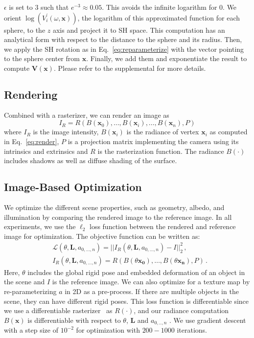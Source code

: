 %
%
$\epsilon$ is set to $3$ such that $e^{-3} \approx 0.05$. 
%
This avoids the infinite logarithm for 0. 
%
We orient $\log (V^{'}_{i}(\omega,\mathbf{x}))$, the logarithm of this approximated function for each sphere, to the $z$ axis and project it to SH space. 
%
This computation has an analytical form with respect to the distance to the sphere and its radius.
%
Then, we apply the SH rotation as in Eq.~\ref{eq:reparameterize} with the vector pointing to the sphere center from $\mathbf{x}$. 
%
Finally, we add them and exponentiate the result to compute $\boldsymbol{V}(\mathbf{x})$.
%
Please refer to the supplemental for more details. 
%
%
\subsection{Rendering}
%
\label{diffuse_shading}
%
Combined with a rasterizer, we can render an image as
%
%
\begin{equation}
I_R=R( B(\mathbf{x}_{0}),\dots,B(\mathbf{x}_{i}),\dots,B(\mathbf{x}_{n}), P)
\end{equation}
%
%
where $I_R$ is the image intensity, $B(\mathbf{x}_{i})$ is the radiance of vertex $\mathbf{x}_{i}$ as computed in Eq.~\ref{eq:render}, $P$ is a projection matrix implementing the camera using its intrinsics and extrinsics and $R$ is the rasterization function. 
%
The radiance $B(\cdot)$ includes shadows as well as diffuse shading of the surface. 
%
%
\subsection{Image-Based Optimization}
%
\label{sec:IBO}
%
We optimize the different scene properties, such as geometry, albedo, and illumination by comparing the rendered image to the reference image. 
%
In all experiments, we use the $\ell_2$ loss function between the rendered and reference image for optimization. 
%
The objective function can be written as:
%
%
\begin{align}
\label{eq:render_loss}
& \mathcal{L}(\theta, \boldsymbol{L}, a_{0,\dots,n}) = || I_R(\theta, \boldsymbol{L}, a_{0,\dots,n}) - I||^2_2 \,, \\
& I_R(\theta, \boldsymbol{L}, a_{0,\dots,n}) = R(B(\theta \mathbf{x_0}), \dots, B(\theta \mathbf{x_n}), P) \,.
\end{align}
%
%
Here, $\theta$ includes the global rigid pose and embedded deformation \cite{sumner2007embedded} of an object in the scene and $I$ is the reference image.
%
We can also optimize for a texture map by re-parameterizing $a$ in 2D as a pre-process. 
%
If there are multiple objects in the scene, they can have different rigid poses.
%
This loss function is differentiable since we use a differentiable rasterizer~\cite{ravi2020pytorch3d} as $R(\cdot)$, and our radiance computation $B(\mathbf{x})$ is differentiable with respect to $\theta$, $\boldsymbol{L}$ and $a_{0,..,n}$ .
%
We use gradient descent with a step size of ${10^{-2}}$ for optimization with $200-1000$ iterations.
%